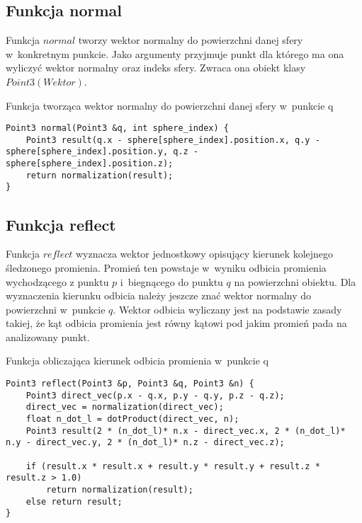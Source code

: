\documentclass[11pt,a4paper,titlepage]{article}
\begin{document}
\subsection{Funkcja normal}
Funkcja $normal$ tworzy wektor normalny do powierzchni danej sfery w~konkretnym punkcie. Jako argumenty przyjmuje punkt dla którego ma ona wyliczyć wektor normalny oraz indeks sfery. Zwraca ona obiekt klasy $Point3 (Wektor)$.
\begin{listing}[H]
\caption{Funkcja tworząca wektor normalny do powierzchni danej sfery w~punkcie q}
\begin{verbatim}
Point3 normal(Point3 &q, int sphere_index) {
	Point3 result(q.x - sphere[sphere_index].position.x, q.y - sphere[sphere_index].position.y, q.z - sphere[sphere_index].position.z);
	return normalization(result);
}
\end{verbatim}
\end{listing}

\subsection{Funkcja reflect}
Funkcja $reflect$ wyznacza wektor jednostkowy opisujący kierunek kolejnego śledzonego promienia. Promień ten powstaje w~wyniku odbicia promienia wychodzącego z punktu $p$ i~biegnącego do punktu $q$ na powierzchni obiektu. Dla wyznaczenia kierunku odbicia należy jeszcze znać wektor normalny do powierzchni w~punkcie $q$. Wektor odbicia wyliczany jest na podstawie zasady takiej, że kąt odbicia promienia jest równy kątowi pod jakim promień pada na analizowany punkt.
\begin{listing}[H]
\caption{Funkcja obliczająca kierunek odbicia promienia w~punkcie q}
\begin{verbatim}
Point3 reflect(Point3 &p, Point3 &q, Point3 &n) {
	Point3 direct_vec(p.x - q.x, p.y - q.y, p.z - q.z);
	direct_vec = normalization(direct_vec);
	float n_dot_l = dotProduct(direct_vec, n);
	Point3 result(2 * (n_dot_l)* n.x - direct_vec.x, 2 * (n_dot_l)* n.y - direct_vec.y, 2 * (n_dot_l)* n.z - direct_vec.z);

	if (result.x * result.x + result.y * result.y + result.z * result.z > 1.0)
		return normalization(result);
	else return result;
}
\end{verbatim}
\end{listing}
\end{document}
